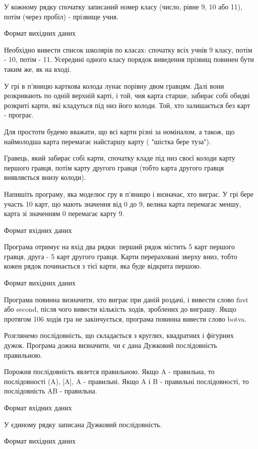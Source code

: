 \documentclass[]{article}
\begin{document}
У кожному рядку спочатку записаний номер класу (число, рівне 9, 10 або 11), потім (через пробіл) - прізвище учня.

Формат вихідних даних

Необхідно вивести список школярів по класах: спочатку всіх учнів 9 класу, потім - 10, потім - 11. Усередині одного класу порядок виведення прізвищ повинен бути таким же, як на вході.

У грі в п'яницю карткова колода лунає порівну двом гравцям. Далі вони розкривають по одній верхній карті, і той, чия карта старше, забирає собі обидві розкриті карти, які кладуться під низ його колоди. Той, хто залишається без карт - програє.

Для простоти будемо вважати, що всі карти різні за номіналом, а також, що наймолодша карта перемагає найстаршу карту ( "шістка бере туза").

Гравець, який забирає собі карти, спочатку кладе під низ своєї колоди карту першого гравця, потім карту другого гравця (тобто карта другого гравця виявляється внизу колоди).

Напишіть програму, яка моделює гру в п'яницю і визначає, хто виграє. У грі бере участь 10 карт, що мають значення від 0 до 9, велика карта перемагає меншу, карта зі значенням 0 перемагає карту 9.

Формат вхідних даних

Програма отримує на вхід два рядки: перший рядок містить 5 карт першого гравця, друга - 5 карт другого гравця. Карти перераховані зверху вниз, тобто кожен рядок починається з тієї карти, яка буде відкрита першою.

Формат вихідних даних

Програма повинна визначити, хто виграє при даній роздачі, і вивести слово first або second, після чого вивести кількість ходів, зроблених до виграшу. Якщо протягом 106 ходів гра не закінчується, програма повинна вивести слово botva.

Розглянемо послідовність, що складається з круглих, квадратних і фігурних дужок. Програма дожна визначити, чи є дана Дужковий послідовність правильною.

Порожня послідовність явлется правильною. Якщо A - правильна, то послідовності (A), [A], {A} - правильні. Якщо A і B - правильні послідовності, то послідовність AB - правильна.

Формат вхідних даних

У єдиному рядку записана Дужковий послідовність.

Формат вихідних даних
\end{document}
